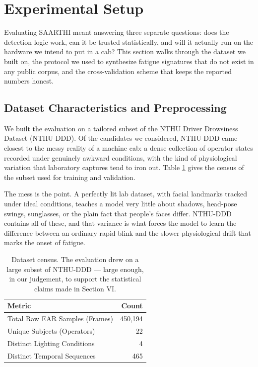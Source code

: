 
\section{Experimental Setup}

Evaluating SAARTHI meant answering three separate questions: does the detection
logic work, can it be trusted statistically, and will it actually run on the
hardware we intend to put in a cab? This section walks through the dataset we
built on, the protocol we used to synthesize fatigue signatures that do not
exist in any public corpus, and the cross-validation scheme that keeps the
reported numbers honest.

\subsection{Dataset Characteristics and Preprocessing}
We built the evaluation on a tailored subset of the NTHU Driver Drowsiness
Dataset (NTHU-DDD). Of the candidates we considered, NTHU-DDD came closest to
the messy reality of a machine cab: a dense collection of operator states
recorded under genuinely awkward conditions, with the kind of physiological
variation that laboratory captures tend to iron out. Table
\ref{tab:dataset_census} gives the census of the subset used for training and
validation.

The mess is the point. A perfectly lit lab dataset, with facial landmarks
tracked under ideal conditions, teaches a model very little about shadows,
head-pose swings, sunglasses, or the plain fact that people's faces differ.
NTHU-DDD contains all of these, and that variance is what forces the model to
learn the difference between an ordinary rapid blink and the slower
physiological drift that marks the onset of fatigue.

\begin{table}[htbp]
\centering
\caption{Dataset census. The evaluation drew on a large subset of NTHU-DDD ---
large enough, in our judgement, to support the statistical claims made in
Section VI.}
\label{tab:dataset_census}
\begin{tabular}{lr}
\toprule
\textbf{Metric} & \textbf{Count} \\
\midrule
Total Raw EAR Samples (Frames) & 450,194 \\
Unique Subjects (Operators) & 22 \\
Distinct Lighting Conditions & 4 \\
Distinct Temporal Sequences & 465 \\
\bottomrule
\end{tabular}
\end{table}

